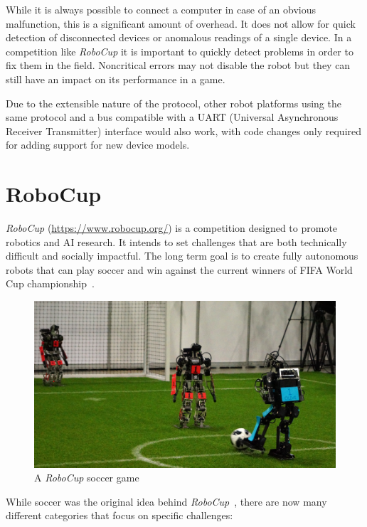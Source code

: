 While it is always possible to connect a computer in case of an obvious malfunction, this is a
significant amount of overhead. It does not allow for quick detection of disconnected devices
or anomalous readings of a single device. In a competition like \textit{RoboCup} it is important
to quickly detect problems in order to fix them in the field. Noncritical errors may not disable
the robot but they can still have an impact on its performance in a game.

Due to the extensible nature of the protocol, other robot platforms using the same protocol and
a bus compatible with a UART (Universal Asynchronous Receiver Transmitter) interface would also
work, with code changes only required for adding support for new device models.

\section{RoboCup}
\label{introduction/robocup}

\textit{RoboCup} (\url{https://www.robocup.org/}) is a competition designed to promote robotics and
AI research. It intends to set challenges that are both technically difficult and socially impactful.
The long term goal is to create fully autonomous robots that can play soccer and win against the
current winners of FIFA World Cup championship~\cite{robocup-objective}.

\begin{figure}[h]
    \centering
    \includegraphics[scale=1.5]{img/robocup_game.png}
    \caption{A \textit{RoboCup} soccer game}
\end{figure}

While soccer was the original idea behind \textit{RoboCup}~\cite{robocup-history}, there are now many
different categories that focus on specific challenges:

